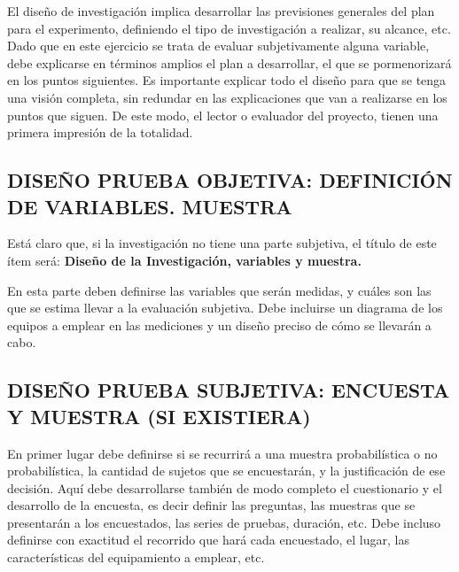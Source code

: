 El diseño de investigación implica desarrollar las previsiones generales del plan para el experimento, definiendo el tipo de investigación a realizar, su alcance, etc. Dado que en este ejercicio se trata de evaluar subjetivamente alguna variable, debe explicarse en términos amplios el plan a desarrollar, el que se pormenorizará en los puntos siguientes. Es importante explicar todo el diseño para que se tenga una visión completa, sin redundar en las explicaciones que van a realizarse en los puntos que siguen. De este modo, el lector o evaluador del proyecto, tienen una primera impresión de la totalidad.

\subsection{DISEÑO PRUEBA OBJETIVA: DEFINICIÓN DE VARIABLES. MUESTRA}

Está claro que, si la investigación no tiene una parte subjetiva, el título de este ítem será: \textbf{Diseño de la Investigación, variables y muestra.}

En esta parte deben definirse las variables que serán medidas, y cuáles son las que se estima llevar a la evaluación subjetiva. Debe incluirse un diagrama de los equipos a emplear en las mediciones y un diseño preciso de cómo se llevarán a cabo.

\subsection{DISEÑO PRUEBA SUBJETIVA: ENCUESTA Y MUESTRA (SI EXISTIERA)}

En primer lugar debe definirse si se recurrirá a una muestra probabilística o no probabilística, la cantidad de sujetos que se encuestarán, y la justificación de ese decisión. Aquí debe desarrollarse también de modo completo el cuestionario y el desarrollo de la encuesta, es decir definir las preguntas, las muestras que se presentarán a los encuestados, las series de pruebas, duración, etc. Debe incluso definirse con exactitud el recorrido que hará cada encuestado, el lugar, las características del equipamiento a emplear, etc.
